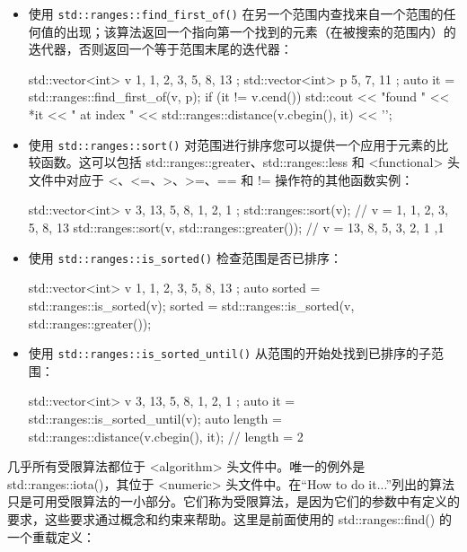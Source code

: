 \begin{itemize}
\item
使用 \verb|std::ranges::find_first_of()| 在另一个范围内查找来自一个范围的任何值的出现；该算法返回一个指向第一个找到的元素（在被搜索的范围内）的迭代器，否则返回一个等于范围末尾的迭代器：

\begin{cpp}
std::vector<int> v{ 1, 1, 2, 3, 5, 8, 13 };
std::vector<int> p{ 5, 7, 11 };
auto it = std::ranges::find_first_of(v, p);
if (it != v.cend())
    std::cout << "found " << *it
    << " at index " << std::ranges::distance(v.cbegin(), it)
    << '\n';
\end{cpp}

\item
使用 \verb|std::ranges::sort()| 对范围进行排序您可以提供一个应用于元素的比较函数。这可以包括 std::ranges::greater、std::ranges::less 和 <functional> 头文件中对应于 <、<=、>、>=、== 和 != 操作符的其他函数实例：

\begin{cpp}
std::vector<int> v{ 3, 13, 5, 8, 1, 2, 1 };
std::ranges::sort(v);
// v = {1, 1, 2, 3, 5, 8, 13}
std::ranges::sort(v, std::ranges::greater());
// v = {13, 8, 5, 3, 2, 1 ,1}
\end{cpp}

\item
使用 \verb|std::ranges::is_sorted()| 检查范围是否已排序：

\begin{cpp}
std::vector<int> v{ 1, 1, 2, 3, 5, 8, 13 };
auto sorted = std::ranges::is_sorted(v);
sorted = std::ranges::is_sorted(v, std::ranges::greater());
\end{cpp}

\item
使用 \verb|std::ranges::is_sorted_until()| 从范围的开始处找到已排序的子范围：

\begin{cpp}
std::vector<int> v{ 3, 13, 5, 8, 1, 2, 1 };
auto it = std::ranges::is_sorted_until(v);
auto length = std::ranges::distance(v.cbegin(), it);
// length = 2
\end{cpp}
\end{itemize}


几乎所有受限算法都位于 <algorithm> 头文件中。唯一的例外是 std::ranges::iota()，其位于 <numeric> 头文件中。在“How to do it...”列出的算法只是可用受限算法的一小部分。它们称为受限算法，是因为它们的参数中有定义的要求，这些要求通过概念和约束来帮助。这里是前面使用的 std::ranges::find() 的一个重载定义：

